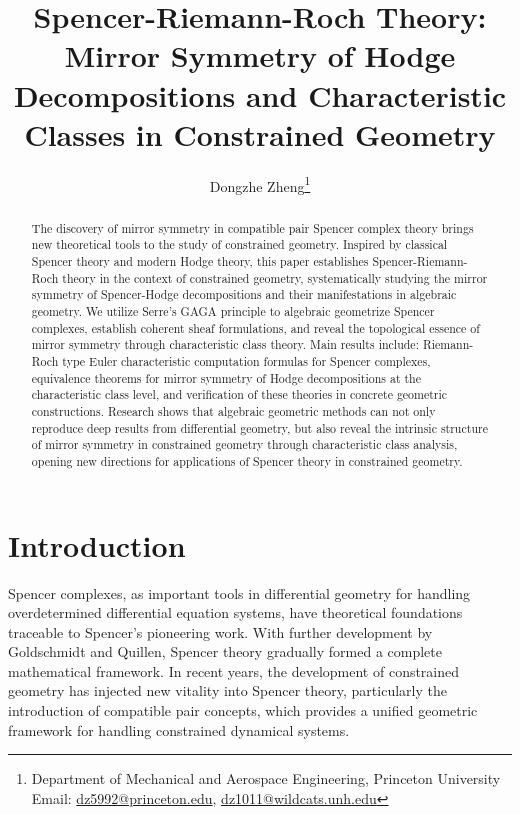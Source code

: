 \documentclass[a4paper,12pt]{extarticle}
\theoremstyle{definition}
\begin{document}
\pagestyle{plain}

\title{Spencer-Riemann-Roch Theory: Mirror Symmetry of Hodge Decompositions and Characteristic Classes in Constrained Geometry}
\author{Dongzhe Zheng\thanks{Department of Mechanical and Aerospace Engineering, Princeton University\\ Email: \href{mailto:dz5992@princeton.edu}{dz5992@princeton.edu}, \href{mailto:dz1011@wildcats.unh.edu}{dz1011@wildcats.unh.edu}}}
\date{}
\maketitle

\begin{abstract}
The discovery of mirror symmetry in compatible pair Spencer complex theory brings new theoretical tools to the study of constrained geometry. Inspired by classical Spencer theory and modern Hodge theory, this paper establishes Spencer-Riemann-Roch theory in the context of constrained geometry, systematically studying the mirror symmetry of Spencer-Hodge decompositions and their manifestations in algebraic geometry. We utilize Serre's GAGA principle to algebraic geometrize Spencer complexes, establish coherent sheaf formulations, and reveal the topological essence of mirror symmetry through characteristic class theory. Main results include: Riemann-Roch type Euler characteristic computation formulas for Spencer complexes, equivalence theorems for mirror symmetry of Hodge decompositions at the characteristic class level, and verification of these theories in concrete geometric constructions. Research shows that algebraic geometric methods can not only reproduce deep results from differential geometry, but also reveal the intrinsic structure of mirror symmetry in constrained geometry through characteristic class analysis, opening new directions for applications of Spencer theory in constrained geometry.
\end{abstract}

\section{Introduction}

Spencer complexes, as important tools in differential geometry for handling overdetermined differential equation systems, have theoretical foundations traceable to Spencer's pioneering work\cite{spencer1962deformation}. With further development by Goldschmidt\cite{goldschmidt1967integrability} and Quillen\cite{quillen1969formal}, Spencer theory gradually formed a complete mathematical framework. In recent years, the development of constrained geometry has injected new vitality into Spencer theory, particularly the introduction of compatible pair concepts, which provides a unified geometric framework for handling constrained dynamical systems.
\end{document}
